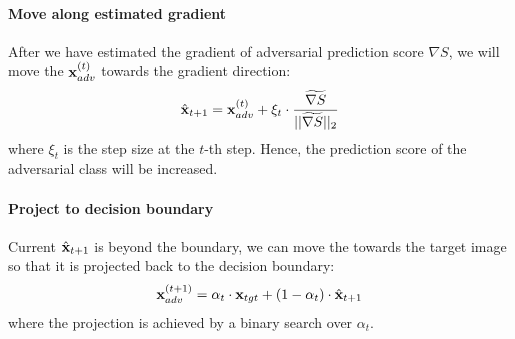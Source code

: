 
\paragraph{Move along estimated gradient}
After we have estimated the gradient of adversarial prediction score $\nabla S$, we will move the ${\bf x}_{adv}^{(t)}$ towards the gradient direction:
\begin{align}
    \label{eqn:move-grad}
    \hat{\bf x}_{t+1} = {\bf x}_{adv}^{(t)} + \xi_t \cdot \frac{\widetilde{\nabla S}}{||\widetilde{\nabla S}||_2}
\end{align}
where $\xi_t$ is the step size at the $t$-th step. Hence, the prediction score of the adversarial class will be increased.

\vspace{-2mm}
\paragraph{Project to decision boundary}
Current $\hat{\bf x}_{t+1}$ is beyond the boundary, we can move the \advimage towards the target image so that it is projected back to the decision boundary:
\begin{align}
    \label{eqn:binary}
    {\bf x}_{adv}^{(t+1)} = \alpha_t \cdot {\bf x}_{tgt} + (1-\alpha_t) \cdot \hat{\bf x}_{t+1}
\end{align}
where the projection is achieved by a binary search over $\alpha_t$.


